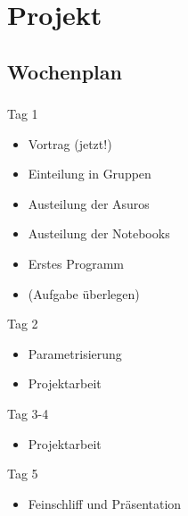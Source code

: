 \section{Projekt}
\subsection{Wochenplan}
\begin{frame}
	\frametitle{\currentsection}
	\framesubtitle{\currentsubsection}
	 {
		\begin{block}{Tag 1}
			\begin{itemize}
				\item Vortrag (jetzt!)
				\item Einteilung in Gruppen
				\item Austeilung der Asuros
				\item Austeilung der Notebooks
				\item Erstes Programm
				\item (Aufgabe überlegen)
			\end{itemize}
		\end{block}
	}
	 {
		\begin{block}{Tag 2}
			\begin{itemize}
				\item Parametrisierung
				\item Projektarbeit
			\end{itemize}
		\end{block}
		\begin{block}{Tag 3-4}
			\begin{itemize}
				\item Projektarbeit
			\end{itemize}
		\end{block}
		\begin{block}{Tag 5}
			\begin{itemize}
				\item Feinschliff und Präsentation
			\end{itemize}
		\end{block}
	}
\end{frame}


